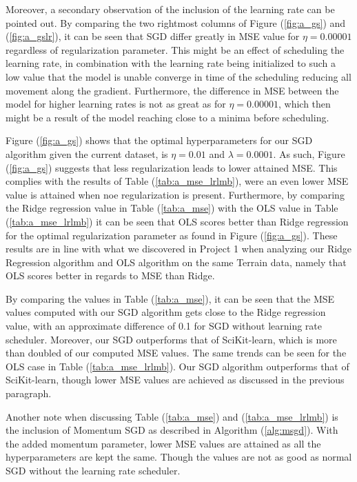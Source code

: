 \documentclass
[twocolumn,
secnumarabic,
nobibnotes,
aps,
prl,
reprint,
groupedaddress,
amsmath,
amssymb
]{revtex4-2}
\begin{document}
Moreover, a secondary observation of the inclusion of the learning rate can be pointed out. By comparing the two rightmost columns of Figure (\ref{fig:a_gs}) and (\ref{fig:a_gslr}), it can be seen that SGD differ greatly in MSE value for $\eta=0.00001$ regardless of regularization parameter. This might be an effect of scheduling the learning rate, in combination with the learning rate being initialized to such a low value that the model is unable converge in time of the scheduling reducing all movement along the gradient. Furthermore, the difference in MSE between the model for higher learning rates is not as great as for $\eta = 0.00001$, which then might be a result of the model reaching close to a minima before scheduling.

Figure (\ref{fig:a_gs}) shows that the optimal hyperparameters for our SGD algorithm given the current dataset, is $\eta = 0.01$ and $\lambda = 0.0001$. As such, Figure (\ref{fig:a_gs}) suggests that less regularization leads to lower attained MSE. This complies with the results of Table (\ref{tab:a_mse_lrlmb}), were an even lower MSE value is attained when noe regularization is present. Furthermore, by comparing the Ridge regression value in Table (\ref{tab:a_mse}) with the OLS value in Table (\ref{tab:a_mse_lrlmb}) it can be seen that OLS scores better than Ridge regression for the optimal regularization parameter as found in Figure (\ref{fig:a_gs}). These results are in line with what we discovered in Project 1 when analyzing our Ridge Regression algorithm and OLS algorithm on the same Terrain data, namely that OLS scores better in regards to MSE than Ridge.

By comparing the values in Table (\ref{tab:a_mse}), it can be seen that
the MSE values computed with our SGD algorithm gets close to the Ridge regression value, with an approximate difference of 0.1 for SGD without learning rate scheduler. Moreover, our SGD outperforms that of SciKit-learn, which is more than doubled of our computed MSE values. The same trends can be seen for the OLS case in Table (\ref{tab:a_mse_lrlmb}). Our SGD algorithm outperforms that of SciKit-learn, though lower MSE values are achieved as discussed in the previous paragraph.

Another note when discussing Table (\ref{tab:a_mse}) and (\ref{tab:a_mse_lrlmb}) is the inclusion of Momentum SGD as described in Algorithm (\ref{alg:msgd}). With the added momentum parameter, lower MSE values are attained as all the hyperparameters are kept the same. Though the values are not as good as normal SGD without the learning rate scheduler.
\end{document}
